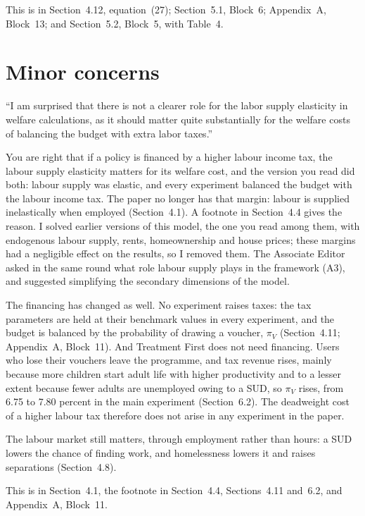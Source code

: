 \documentclass[11pt]{article}
\begin{document}
\begin{response}
This is in Section~4.12, equation~(27); Section~5.1, Block~6; Appendix~A, Block~13;
and Section~5.2, Block~5, with Table~4.
\end{response}

\section*{Minor concerns}

\begin{referee}
``I am surprised that there is not a clearer role for the labor supply elasticity
in welfare calculations, as it should matter quite substantially for the welfare
costs of balancing the budget with extra labor taxes.''
\end{referee}
\begin{response}
You are right that if a policy is financed by a higher labour income tax, the labour
supply elasticity matters for its welfare cost, and the version you read did both:
labour supply was elastic, and every experiment balanced the budget with the labour
income tax. \open The paper no longer has that margin: labour is supplied
inelastically when employed (Section~4.1). A footnote in Section~4.4 gives the reason.
I solved earlier versions of this model, the one you read among them, with endogenous
labour supply, rents, homeownership and house prices; these margins had a negligible
effect on the results, so I removed them. The Associate Editor asked in the same round
what role labour supply plays in the framework (A3), and suggested simplifying the
secondary dimensions of the model.

The financing has changed as well. No experiment raises taxes: the tax parameters are
held at their benchmark values in every experiment, and the budget is balanced by the
probability of drawing a voucher, $\pi_V$ (Section~4.11; Appendix~A, Block~11). And
Treatment First does not need financing. Users who lose their vouchers leave the
programme, and tax revenue rises, mainly because more children start adult life with
higher productivity and to a lesser extent because fewer adults are unemployed owing to
a SUD, so $\pi_V$ rises, from 6.75 to 7.80 percent in the main experiment
(Section~6.2). The deadweight cost of a higher labour tax therefore does not arise in
any experiment in the paper.

The labour market still matters, through employment rather than hours: a SUD lowers
the chance of finding work, and homelessness lowers it and raises separations
(Section~4.8).

This is in Section~4.1, the footnote in Section~4.4, Sections~4.11 and~6.2, and
Appendix~A, Block~11.
\end{response}
\end{document}
